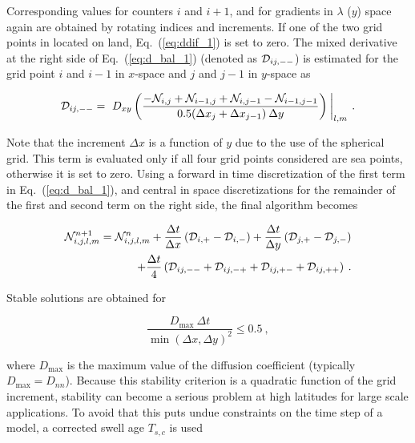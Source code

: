 \noindent
Corresponding values for counters $i$ and $i+1$, and for gradients in
$\lambda$ ($y$) space again are obtained by rotating indices and
increments. If one of the two grid points in located on land,
Eq.~(\ref{eq:ddif_1}) is set to zero. The mixed derivative at the right side
of Eq.~(\ref{eq:d_bal_1}) (denoted as ${\cal D}_{ij,--}$) is estimated for the grid
point $i$ and $i-1$ in $x$-space and $j$ and $j-1$ in $y$-space as


\begin{equation}
{\cal D}_{ij,--} = \left . \: D_{xy} 
\left ( \frac{- {\cal N}_{i,j} + {\cal N}_{i-1,j} +
              {\cal N}_{i,j-1} - {\cal N}_{i-1,j-1}}
           {0.5 ( \Delta x_j + \Delta x_{j-1} ) \: \Delta y}
              \right ) \: \right |_{l,m} 
\: . \label{eq:ddif_2} \end{equation}

\noindent
Note that the increment $\Delta x$ is a function of $y$ due to the use of the
spherical grid. This term is evaluated only if all four grid points considered
are sea points, otherwise it is set to zero. Using a forward in time
discretization of the first term in Eq.~(\ref{eq:d_bal_1}), and central in
space discretizations for the remainder of the first and second term on the
right side, the final algorithm becomes


\begin{eqnarray}
{\cal N}_{i,j,l,m}^{n+1} = {\cal N}_{i,j,l,m}^n + 
\frac{\Delta t}{\Delta x} 
   \left ( {\cal D}_{i,+} - {\cal D}_{i,-} \right ) +
\frac{\Delta t}{\Delta y}
   \left ( {\cal D}_{j,+} - {\cal D}_{j,-} \right ) \nonumber \\
+ \frac{\Delta t}{4} \left ( {\cal D}_{ij,--} + 
   {\cal D}_{ij,-+} + {\cal D}_{ij,+-} + {\cal D}_{ij,++} \right )
\: . \label{eq:ddif_3} \end{eqnarray}

\noindent
Stable solutions are obtained for \citep[e.g.,][Part I section
7.1.1]{bk:Fle88}


\begin{equation}
\frac{D_{\max} \: \Delta t}{\min(\Delta x , \Delta y)^2}
\leq 0.5 \: , \label{eq:ddif_4} \end{equation}

\noindent
where $D_{\max}$ is the maximum value of the diffusion coefficient (typically
$D_{\max} = D_{nn}$). Because this stability criterion is a quadratic function
of the grid increment, stability can become a serious problem at high
latitudes for large scale applications. To avoid that this puts undue
constraints on the time step of a model, a corrected swell age $T_{s,c}$ is
used

